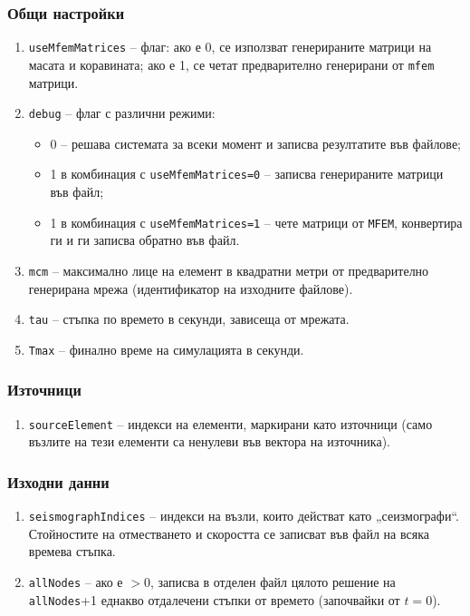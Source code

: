 \documentclass{report}
\begin{document}
	\subsubsection*{Общи настройки}
	\begin{enumerate}[label=\roman*)]
		\item \texttt{useMfemMatrices} – флаг: ако е 0, се използват генерираните матрици на масата и коравината; ако е 1, се четат предварително генерирани от \texttt{mfem} матрици.
		\item \texttt{debug} – флаг с различни режими:
		\begin{itemize}
			\item 0 – решава системата за всеки момент и записва резултатите във файлове;
			\item 1 в комбинация с \texttt{useMfemMatrices=0} – записва генерираните матрици във файл;
			\item 1 в комбинация с \texttt{useMfemMatrices=1} – чете матрици от \texttt{MFEM}, конвертира ги и ги записва обратно във файл.
		\end{itemize}
		\item \texttt{mcm} – максимално лице на елемент в квадратни метри от предварително генерирана мрежа (идентификатор на изходните файлове).
		\item \texttt{tau} – стъпка по времето в секунди, зависеща от мрежата.
		\item \texttt{Tmax} – финално време на симулацията в секунди.
	\end{enumerate}
	
	\subsubsection*{Източници}
	\begin{enumerate}[resume, label=\roman*)]
		\item \texttt{sourceElement} – индекси на елементи, маркирани като източници (само възлите на тези елементи са ненулеви във вектора на източника).
	\end{enumerate}
	
	\subsubsection*{Изходни данни}
	\begin{enumerate}[resume, label=\roman*)]
		\item \texttt{seismographIndices} – индекси на възли, които действат като „сеизмографи“. Стойностите на отместването и скоростта се записват във файл на всяка времева стъпка.
		\item \texttt{allNodes} – ако е $>0$, записва в отделен файл цялото решение на \texttt{allNodes}+1 еднакво отдалечени стъпки от времето (започвайки от $t=0$).
	\end{enumerate}
	
\end{document}
